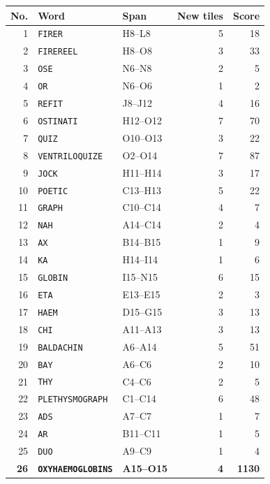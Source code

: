 \documentclass[letterpaper]{article}
\begin{document}
\begin{center}
\fontsize{8}{8.15}\selectfont
\setlength{\tabcolsep}{4pt}
\renewcommand{\arraystretch}{0.80}
\begin{tabular}{@{}rllrr@{}}\toprule
No. & Word & Span & New tiles & Score\\
\midrule
1 & \texttt{FIRER} & H8--L8 & 5 & 18\\
2 & \texttt{FIREREEL} & H8--O8 & 3 & 33\\
3 & \texttt{OSE} & N6--N8 & 2 & 5\\
4 & \texttt{OR} & N6--O6 & 1 & 2\\
5 & \texttt{REFIT} & J8--J12 & 4 & 16\\
6 & \texttt{OSTINATI} & H12--O12 & 7 & 70\\
7 & \texttt{QUIZ} & O10--O13 & 3 & 22\\
8 & \texttt{VENTRILOQUIZE} & O2--O14 & 7 & 87\\
9 & \texttt{JOCK} & H11--H14 & 3 & 17\\
10 & \texttt{POETIC} & C13--H13 & 5 & 22\\
11 & \texttt{GRAPH} & C10--C14 & 4 & 7\\
12 & \texttt{NAH} & A14--C14 & 2 & 4\\
13 & \texttt{AX} & B14--B15 & 1 & 9\\
14 & \texttt{KA} & H14--I14 & 1 & 6\\
15 & \texttt{GLOBIN} & I15--N15 & 6 & 15\\
16 & \texttt{ETA} & E13--E15 & 2 & 3\\
17 & \texttt{HAEM} & D15--G15 & 3 & 13\\
18 & \texttt{CHI} & A11--A13 & 3 & 13\\
19 & \texttt{BALDACHIN} & A6--A14 & 5 & 51\\
20 & \texttt{BAY} & A6--C6 & 2 & 10\\
21 & \texttt{THY} & C4--C6 & 2 & 5\\
22 & \texttt{PLETHYSMOGRAPH} & C1--C14 & 6 & 48\\
23 & \texttt{ADS} & A7--C7 & 1 & 7\\
24 & \texttt{AR} & B11--C11 & 1 & 5\\
25 & \texttt{DUO} & A9--C9 & 1 & 4\\
\midrule
\textbf{26} & \textbf{\texttt{OXYHAEMOGLOBINS}} & \textbf{A15--O15} & \textbf{4} & \textbf{1130}\\
\bottomrule\end{tabular}
\end{center}
\vfill
\clearpage
\end{document}
